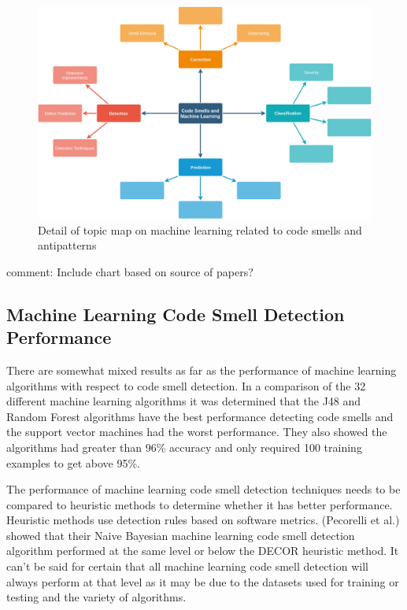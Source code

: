 \documentclass[conference]{IEEEtran}
\begin{document}
\begin{figure}[!ht]
  \centerline{\includegraphics[width=\textwidth]{ML-codesmells.png}}
  \caption{Detail of topic map on machine learning related to code smells and antipatterns}
  \label{fig:ML}
\end{figure} 

comment: Include chart based on source of papers?

\subsection{Machine Learning Code Smell Detection Performance}
There are somewhat mixed results as far as the performance of machine learning algorithms with respect to code smell detection\cite{nucci_detecting_2018}.
In a comparison of the 32 different machine learning algorithms\cite{arcelli_fontana_comparing_2016} it was determined that the J48 and Random Forest algorithms have the best performance detecting code smells and the support vector machines had the worst performance. They also showed the algorithms had greater than 96\% accuracy and only required 100 training examples to get above 95\%.

The performance of machine learning code smell detection techniques needs to be compared to heuristic methods to determine whether it has better performance. Heuristic methods use detection rules based on software metrics. (Pecorelli et al.) showed\cite{pecorelli_comparing_2019} that their Naive Bayesian machine learning code smell detection algorithm performed at the same level or below the DECOR heuristic method. 
It can't be said for certain that all machine learning code smell detection will always perform at that level as it may be due to the datasets used for training or testing and the variety of algorithms.
\end{document}
